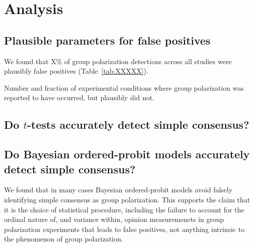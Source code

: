 \documentclass[11pt, letterpaper]{article}
\begin{document}
\section{Analysis}

\subsection{Plausible parameters for false positives}

We found that X\% of group polarization detections across all studies were 
plausibly false positives (Table~\ref{tab:XXXXX}).

\vspace{.5em}
% 
\begin{table}[H]
    \begin{center}
      \caption{Number and fraction of experimental conditions where group polarization was
               reported to have occurred, but plausibly did not.}
      \vspace{.5em}
      
    \end{center}
  \end{table}



\subsection{Do $t$-tests accurately detect simple consensus?}





\hspace{-1em}

% 

\subsection{Do Bayesian ordered-probit models accurately detect simple consensus?}

We found that in many cases Bayesian ordered-probit models avoid falsely identifying simple
consensus as group polarization. This supports the claim that it is the choice of statistical
procedure, including the failure to account for the ordinal nature of, and variance within,
opinion measuremenets in group polarization experiments that leads to false
positives, not anything intrinsic to the phenomenon of group polarization.
\end{document}
